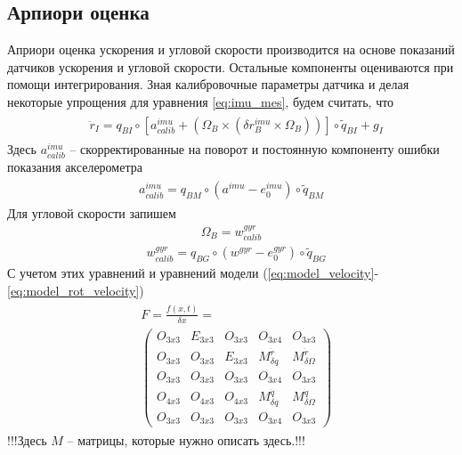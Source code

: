\documentclass[a4paper,12pt]{article}
\begin{document}
\subsection{Арпиори оценка}
Априори оценка ускорения и угловой скорости производится на основе показаний датчиков ускорения и угловой скорости. Остальные компоненты оцениваются при помощи интегрирования.
Зная калибровочные параметры датчика и делая некоторые упрощения для уравнения \eqref{eq:imu_mes}, будем считать, что
\begin{align} \label{eq:rddot_i_simle}
\begin{split}
&\ddot{r}_{I} = {q}_{BI} \circ  [a^{imu}_{calib} + (\Omega_B \times (\delta r^{imu}_B \times \Omega_B))] \circ \tilde{q}_{BI} + g_I
\end{split}
\end{align}
Здесь $a^{imu}_{calib}$ -- скорректированные на поворот и постоянную компоненту ошибки показания акселерометра
\begin{align} 
\begin{split}
a^{imu}_{calib} = q_{BM} \circ (a^{imu} - e^{imu}_0) \circ \tilde{q}_{BM}
\end{split}
\end{align}
Для угловой скорости запишем
\begin{align} 
\Omega_B = w^{\textit{gyr}}_{calib}
\end{align}
\begin{align} 
&w^{\textit{gyr}}_{calib} = q_{BG} \circ (w^{\textit{gyr}} - e_0^{\textit{gyr}}) \circ \tilde{q}_{BG}
\end{align}
С учетом этих уравнений и уравнений модели  (\ref{eq:model_velocity}-\ref{eq:model_rot_velocity})
\begin{align}
\begin{split}
&F = \frac{f(x,t)}{\delta x} = \\
&\begin{pmatrix}
O_{3x3} & E_{3x3} & O_{3x3} & O_{3x4} & O_{3x3}\\
O_{3x3} & O_{3x3} & E_{3x3} & M^{\ddot{r}}_{\delta q} &M^{\ddot{r}}_{\delta \Omega}\\
O_{3x3} & O_{3x3} & O_{3x3} & O_{3x4} & O_{3x3}\\
O_{4x3} & O_{4x3} & O_{4x3} & M^{\dot{q}}_{\delta q} & M^{\dot{q}}_{\delta \Omega}\\
O_{3x3} & O_{3x3} & O_{3x3} & O_{3x4} & O_{3x3}
\end{pmatrix}
\end{split}
\end{align}
!!!Здесь $M$ -- матрицы, которые нужно описать здесь.!!!
\end{document}
